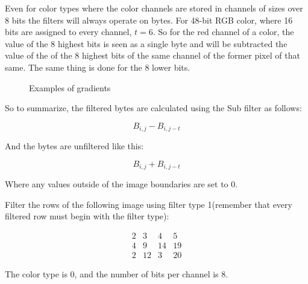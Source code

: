 Even for color types where the color channels are stored in channels
of sizes over $8$ bits the filters will always operate on bytes. For
48-bit RGB color, where 16 bits are assigned to every channel,
$t=6$. So for the red channel of a color, the value of the 8 highest
bits is seen as a single byte and will be subtracted the value of the
of the 8 highest bits of the same channel of the former pixel of that
same. The same thing is done for the 8 lower bits.

\begin{figure}[h!]
  \centering


  \caption{Examples of gradients}
\end{figure}

So to summarize, the filtered bytes are calculated using the Sub
filter as follows:

\begin{equation*}
  B_{i,j} - B_{i,j-t}
\end{equation*}

And the bytes are unfiltered like this:

\begin{equation*}
  B_{i,j} + B_{i,j-t}
\end{equation*}

Where any values outside of the image boundaries are set to $0$.

\begin{Exercise}[label={filter-1}]

  Filter the rows of the following image using filter type 1(remember
  that every filtered row must begin with the filter type):

  \[
  \begin{matrix}
    2 & 3 & 4 & 5 \\
    4 & 9 & 14 & 19 \\
    2 & 12 & 3 & 20
  \end{matrix}
  \]

  The color type is $0$, and the number of bits per channel is $8$.

\end{Exercise}

